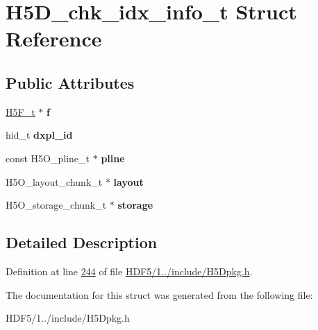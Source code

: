 \hypertarget{struct_h5_d__chk__idx__info__t}{}\section{H5\+D\+\_\+chk\+\_\+idx\+\_\+info\+\_\+t Struct Reference}
\label{struct_h5_d__chk__idx__info__t}
\subsection*{Public Attributes}
\begin{DoxyCompactItemize}
\item 
\mbox{\label{struct_h5_d__chk__idx__info__t_a89588cbacc95c463513f8277b6336f86}} 
\hyperlink{struct_h5_f__t}{H5\+F\+\_\+t} $\ast$ {\bfseries f}
\item 
\mbox{\label{struct_h5_d__chk__idx__info__t_a189c5409ab3a2c001dbdb8bc5783fabf}} 
hid\+\_\+t {\bfseries dxpl\+\_\+id}
\item 
\mbox{\label{struct_h5_d__chk__idx__info__t_a1d1f2346b0b7b27442e1f84bee90b9ef}} 
const H5\+O\+\_\+pline\+\_\+t $\ast$ {\bfseries pline}
\item 
\mbox{\label{struct_h5_d__chk__idx__info__t_a0dba5e1dfdb2f2aa115b16d5451f36f4}} 
H5\+O\+\_\+layout\+\_\+chunk\+\_\+t $\ast$ {\bfseries layout}
\item 
\mbox{\label{struct_h5_d__chk__idx__info__t_a75fe80eab92a42adba5f97d13aad4350}} 
H5\+O\+\_\+storage\+\_\+chunk\+\_\+t $\ast$ {\bfseries storage}
\end{DoxyCompactItemize}


\subsection{Detailed Description}


Definition at line \hyperlink{_h_d_f5_21_810_81_2include_2_h5_dpkg_8h_source_l00244}{244} of file \hyperlink{_h_d_f5_21_810_81_2include_2_h5_dpkg_8h_source}{H\+D\+F5/1../include/\+H5\+Dpkg.\+h}.



The documentation for this struct was generated from the following file\+:\begin{DoxyCompactItemize}
\item 
H\+D\+F5/1../include/\+H5\+Dpkg.\+h\end{DoxyCompactItemize}
